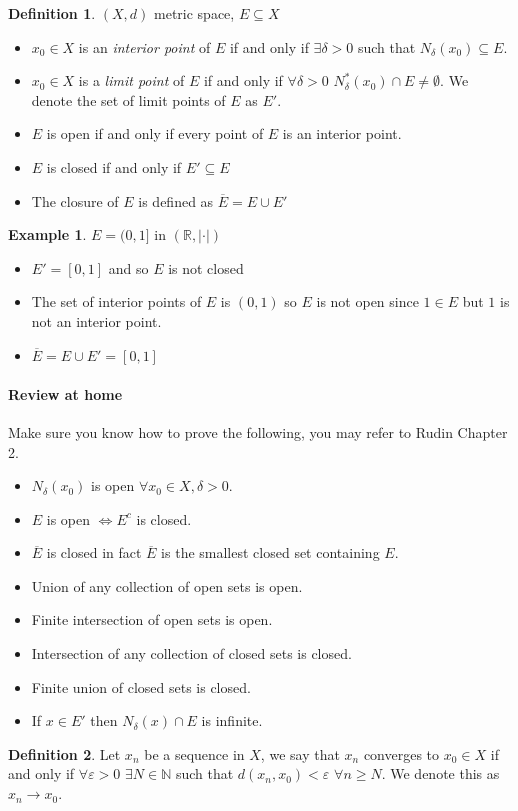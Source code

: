 \documentclass[11pt,openany]{book}
\theoremstyle{plain}
\theoremstyle{definition}
\newtheorem{definition}{Definition}[chapter]
\newtheorem{example}{Example}[chapter]
\theoremstyle{remark}
\newcommand{\R}{\mathbb{R}}
\newcommand{\N}{\mathbb{N}}
\newcommand{\eps}{\varepsilon}
\begin{document}
\begin{definition}
    $(X,d)$ metric space, $E \subseteq X$ \begin{itemize}
        \item $x_0 \in X$ is an \emph{interior point} of $E$ if and only if $\exists \delta >0$ such that $N_{\delta}(x_0) \subseteq E$.
        \item $x_0 \in X$ is a \emph{limit point} of $E$ if and only if $\forall \delta >0$ $N_{\delta}^*(x_0) \cap E \neq \emptyset$. We denote the set of limit points of $E$ as $E'$.
        \item $E$ is open if and only if every point of $E$ is an interior point.
        \item $E$ is closed if and only if $E' \subseteq E$
        \item The closure of $E$ is defined as $\overline{E} = E \cup E'$
    \end{itemize}
\end{definition}
\begin{example}
    $E = (0,1]$ in $(\R, |\cdot|)$ \begin{itemize}
        \item $E' = [0,1]$ and so $E$ is not closed
        \item The set of interior points of $E$ is $(0,1)$ so $E$ is not open since $1\in E$ but $1$ is not an interior point.
        \item $\overline{E} = E \cup E' = [0,1]$
    \end{itemize}
\end{example}

\paragraph{\bf Review at home} Make sure you know how to prove the following, you may refer to Rudin Chapter 2.
\begin{itemize}
    \item $N_{\delta}(x_0)$ is open $\forall x_0 \in X, \delta >0$.
    \item $E$ is open $\iff E^c$ is closed.
    \item $\overline{E}$ is closed in fact $\overline{E}$ is the smallest closed set containing $E$.
    \item Union of any collection of open sets is open.
    \item Finite intersection of open sets is open.
    \item Intersection of any collection of closed sets is closed.
    \item Finite union of closed sets is closed.
    \item If $x \in E'$ then $N_{\delta}(x) \cap E$ is infinite.
\end{itemize}
\begin{definition}
    Let $x_n$ be a sequence in $X$, we say that $x_n$ converges to $x_0 \in X$ if and only if $\forall \eps > 0$ $\exists N \in \N$ such that $d(x_n, x_0) < \eps$ $\forall n \ge N$. We denote this as $x_n \to x_0$.
\end{definition}
\end{document}
